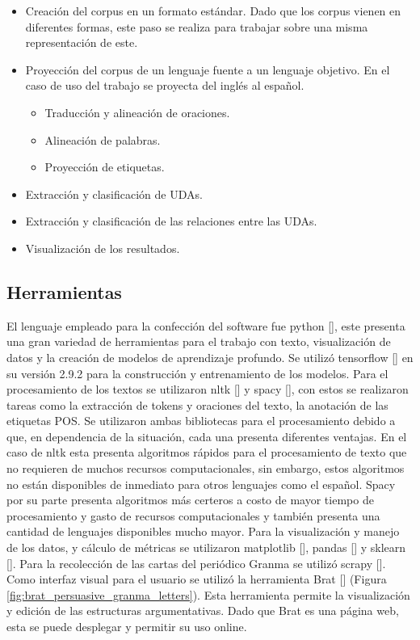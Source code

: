 \begin{itemize}
    \item Creación del corpus en un formato estándar. Dado que los corpus vienen en diferentes 
	formas, este paso se realiza para trabajar sobre una misma representación de este.
    \item Proyección del corpus de un lenguaje fuente a un lenguaje objetivo. En el caso de 
	uso del trabajo se proyecta del inglés al español.
    \begin{itemize}
        \item Traducción y alineación de oraciones.
        \item Alineación de palabras.
        \item Proyección de etiquetas.
    \end{itemize}
    \item Extracción y clasificación de UDAs.
    \item Extracción y clasificación de las relaciones entre las UDAs.
    \item Visualización de los resultados.
\end{itemize}

\subsection{Herramientas}

El lenguaje empleado para la confección del software fue python [\cite{python}], este presenta 
una gran variedad de herramientas 
para el trabajo con texto, visualización de datos y la creación de modelos de aprendizaje profundo.
Se utilizó tensorflow [\cite{tensorflow}] en su versión 2.9.2 para la construcción y entrenamiento de los modelos. 
Para el procesamiento de los textos se utilizaron nltk [\cite{nltk}] y spacy [\cite{spacy}], con estos se realizaron tareas
como la extracción de tokens y oraciones del texto, la anotación de las etiquetas POS. Se utilizaron 
ambas bibliotecas para el procesamiento debido a que, en dependencia de la situación, cada una presenta diferentes
ventajas. En el caso de nltk esta presenta algoritmos rápidos para el procesamiento de texto que no 
requieren de muchos recursos computacionales, sin embargo, estos algoritmos no están disponibles de inmediato
para otros lenguajes como el español. Spacy por su parte presenta algoritmos más certeros a costo 
de mayor tiempo de procesamiento y gasto de recursos computacionales y también presenta una cantidad de lenguajes 
disponibles mucho mayor. Para la visualización y manejo de los datos, y cálculo de métricas se utilizaron 
matplotlib [\cite{matplotlib}], pandas [\cite{pandas}] y sklearn [\cite{sklearn}]. 
Para la recolección de las cartas del periódico Granma se utilizó scrapy [\cite{scrapy}].
Como interfaz visual para el usuario se utilizó la herramienta Brat [\cite{brat}] 
(Figura \ref{fig:brat_persuasive_granma_letters}). Esta herramienta permite
la visualización y edición de las estructuras argumentativas. Dado que Brat es una página web, esta se puede
desplegar y permitir su uso online.

